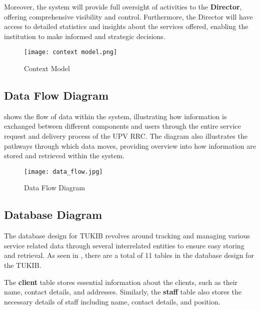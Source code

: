 Moreover, the system will provide full oversight of activities to the \textbf{Director}, offering comprehensive visibility and control. Furthermore, the Director will have access to detailed statistics and insights about the services offered, enabling the institution to make informed and strategic decisions.

\begin{figure}[h]
	\centering 
	\texttt{[image: context model.png]}
	\caption{Context Model}
	\label{fig:context_model}
\end{figure}

\newpage

\subsection{Data Flow Diagram}

 shows the flow of data within the system, illustrating how information is exchanged between different components and users through the entire service request and delivery process of the UPV RRC. The diagram also illustrates the pathways through which data moves, providing overview into how information are stored and retrieved within the system.

\begin{figure}[h]
	\centering 
	\texttt{[image: data\_flow.jpg]}
	\caption{Data Flow Diagram}
	\label{fig:data_flow}
\end{figure}

\newpage

\subsection{Database Diagram}

The database design for TUKIB revolves around tracking and managing various service related data through several interrelated entities to ensure easy storing and retrieval. As seen in , there are a total of 11 tables in the database design for the TUKIB. 

The \textbf{client} table stores essential information about the clients, such as their name, contact details, and addresses. Similarly, the \textbf{staff} table also stores the necessary details of staff including name, contact details, and position. 

